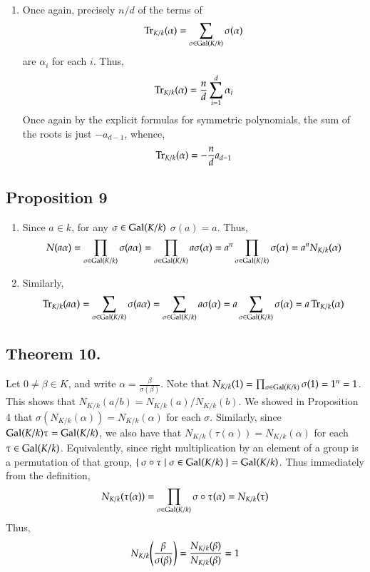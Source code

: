 \documentclass[12pt]{article}
\theoremstyle{definitionstyle}
\newcommand{\Gal}{\mathrm{Gal}\qty}
\begin{document}
\begin{enumerate}[label=(\arabic*)]
 		\item Once again, precisely $n/d$ of the terms of
 		\begin{align*}
 			\Tr_{K/k}(\alpha) = \sum_{\sigma \in \Gal(K/k)} \sigma(\alpha)
 		\end{align*}
 		are $\alpha_i$ for each $i$. Thus,
 		\begin{align*}
 			\Tr_{K/k}(\alpha) = \frac nd \sum_{i=1}^d \alpha_i
 		\end{align*}
 		Once again by the explicit formulas for symmetric polynomials, the sum of the roots is just $-a_{d-1}$, whence,
 		\begin{align*}
 			\Tr_{K/k}(\alpha) = -\frac nd a_{d-1}
 		\end{align*}
	\end{enumerate}

	\subsection*{Proposition 9}
	\begin{enumerate}[label=(\arabic*)]
		\item Since $a \in k$, for any $\sigma \in \Gal(K/k)$ $\sigma(a) = a$. Thus,
		\begin{align*}
			N(a\alpha) = \prod_{\sigma \in \Gal(K/k)} \sigma(a\alpha) = \prod_{\sigma \in \Gal(K/k)} a\sigma(\alpha) = a^n\prod_{\sigma \in \Gal(K/k)} \sigma(\alpha) = a^nN_{K/k}(\alpha)
		\end{align*}
	
		\item Similarly,
		\begin{align*}
			\Tr_{K/k}(a\alpha) = \sum_{\sigma \in \Gal(K/k)} \sigma(a\alpha) = \sum_{\sigma \in \Gal(K/k)} a\sigma(\alpha) = a\sum_{\sigma \in \Gal(K/k)} \sigma(\alpha) = a\Tr_{K/k}(\alpha)
		\end{align*}
	\end{enumerate}
	
	\subsection*{Theorem 10.}
	Let $0 \neq \beta \in K$, and write $\alpha = \frac{\beta}{\sigma(\beta)}$. Note that $N_{K/k}(1) = \prod_{\sigma \in \Gal(K/k)} \sigma(1) = 1^n = 1$. This shows that $N_{K/k}(a/b) = N_{K/k}(a)/N_{K/k}(b)$. We showed in Proposition 4 that $\sigma(N_{K/k}(\alpha)) = N_{K/k}(\alpha)$ for each $\sigma$. Similarly, since $\Gal(K/k)\tau = \Gal(K/k)$, we also have that $N_{K/k}(\tau(\alpha)) = N_{K/k}(\alpha)$ for each $\tau \in \Gal(K/k)$. Equivalently, since right multiplication by an element of a group is a permutation of that group, 
	$\Set{\sigma \circ \tau \mid \sigma \in \Gal(K/k)} = \Gal(K/k)$. Thus immediately from the definition,
	\begin{align*}
		N_{K/k}(\tau(\alpha)) = \prod_{\sigma \in \Gal(K/k)} \sigma \circ \tau(\alpha) = N_{K/k}(\tau)
	\end{align*}
	Thus,
	\begin{align*}
		N_{K/k}\qty(\frac{\beta}{\sigma(\beta)}) = \frac{N_{K/k}(\beta)}{N_{K/k}(\beta)} = 1
	\end{align*}
	
\end{document}
